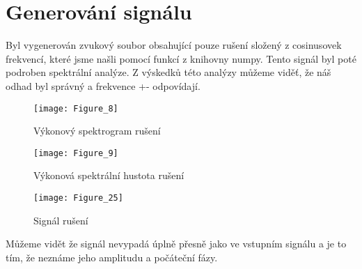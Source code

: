 \section{Generování signálu}

Byl vygenerován zvukový soubor obsahující pouze rušení složený z cosinusovek frekvencí, které jsme našli pomocí funkcí z knihovny numpy. Tento signál byl poté podroben spektrální analýze.
Z výskedků této analýzy můžeme viděť, že náš odhad byl správný a frekvence +- odpovídají.

\begin{figure}[H] 
	\centering
	\texttt{[image: Figure\_8]}
	\caption{Výkonový spektrogram rušení}
\end{figure}

\begin{figure}[H] 
	\centering
	\texttt{[image: Figure\_9]}
	\caption{Výkonová spektrální hustota rušení}
\end{figure}

\begin{landscape}
\begin{figure}[H] 
	\centering
	\texttt{[image: Figure\_25]}
	\caption{Signál rušení}
\end{figure}
\end{landscape}

Můžeme vidět že signál nevypadá úplně přesně jako ve vstupním signálu a je to tím, že neznáme jeho amplitudu a počáteční fázy.
